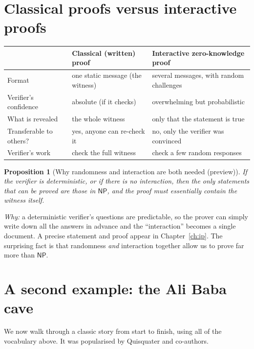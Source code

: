 \documentclass[11pt,a4paper]{report}
\theoremstyle{plain}
\newtheorem{proposition}[theorem]{Proposition}
\theoremstyle{definition}
\theoremstyle{remark}
\newcommand{\NP}{\mathsf{NP}}\newcommand{\BPP}{\mathsf{BPP}}\newcommand{\IP}{\mathsf{IP}}
\begin{document}
\section{Classical proofs versus interactive proofs}
\begin{center}
\renewcommand{\arraystretch}{1.25}
\begin{tabular}{@{}L{3.1cm} L{5.6cm} L{5.6cm}@{}}
\toprule
 & \textbf{Classical (written) proof} & \textbf{Interactive zero-knowledge proof}\\
\midrule
Format & one static message (the witness) & several messages, with random challenges\\
Verifier's confidence & absolute (if it checks) & overwhelming but probabilistic\\
What is revealed & the whole witness & only that the statement is true\\
Transferable to others? & yes, anyone can re-check it & no, only the verifier was convinced\\
Verifier's work & check the full witness & check a few random responses\\
\bottomrule
\end{tabular}
\end{center}

\begin{proposition}[Why randomness and interaction are both needed (preview)]
If the verifier is deterministic, or if there is no interaction, then the only statements that can be proved are those in $\NP$, and the proof must essentially contain the witness itself.
\end{proposition}
\noindent\emph{Why:} a deterministic verifier's questions are predictable, so the prover can simply write down all the answers in advance and the ``interaction'' becomes a single document. A precise statement and proof appear in Chapter~\ref{ch:ip}. The surprising fact is that randomness \emph{and} interaction together allow us to prove far more than $\NP$.

\section{A second example: the Ali Baba cave}\label{sec:cave}
We now walk through a classic story from start to finish, using all of the vocabulary above. It was popularised by Quisquater and co-authors.
\end{document}

